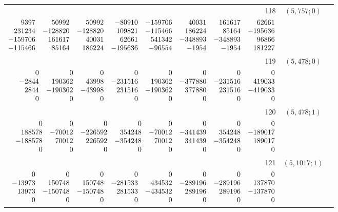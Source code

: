 \documentclass[11pt]{article}
\theoremstyle{remark}
\numberwithin{equation}{section}
\begin{document}
\begin{longtable}{rcl}
118 & $(5,757;0)$ & \begin{tabular}[t]{@{}l@{}}$w_i=\displaystyle \frac{7778090159809309}{114395153011305824000000000000000000}$\\[3pt]{\scriptsize$\begin{array}{@{}rrrrrrrr@{}}9397 & 50992 & 50992 & -80910 & -159706 & 40031 & 161617 & 62661\\231234 & -128820 & -128820 & 109821 & -115466 & 186224 & 85164 & -195636\\-159706 & 161617 & 40031 & 62661 & 541342 & -348893 & -348893 & 96866\\-115466 & 85164 & 186224 & -195636 & -96554 & -1954 & -1954 & 181227\end{array}$}\end{tabular}\\[8pt]
119 & $(5,478;0)$ & \begin{tabular}[t]{@{}l@{}}$w_i=\displaystyle \frac{14506664330807267}{18089855369164800000000000000000000}$\\[3pt]{\scriptsize$\begin{array}{@{}rrrrrrrr@{}}0 & 0 & 0 & 0 & 0 & 0 & 0 & 0\\-2844 & 190362 & 43998 & -231516 & 190362 & -377880 & -231516 & 419033\\2844 & -190362 & -43998 & 231516 & -190362 & 377880 & 231516 & -419033\\0 & 0 & 0 & 0 & 0 & 0 & 0 & 0\end{array}$}\end{tabular}\\[8pt]
120 & $(5,478;1)$ & \begin{tabular}[t]{@{}l@{}}$w_i=\displaystyle \frac{11607564714560783}{8972274846207200000000000000000000}$\\[3pt]{\scriptsize$\begin{array}{@{}rrrrrrrr@{}}0 & 0 & 0 & 0 & 0 & 0 & 0 & 0\\188578 & -70012 & -226592 & 354248 & -70012 & -341439 & 354248 & -189017\\-188578 & 70012 & 226592 & -354248 & 70012 & 341439 & -354248 & 189017\\0 & 0 & 0 & 0 & 0 & 0 & 0 & 0\end{array}$}\end{tabular}\\[8pt]
121 & $(5,1017;1)$ & \begin{tabular}[t]{@{}l@{}}$w_i=\displaystyle \frac{3057017586128491}{3569484717170392800000000000000000}$\\[3pt]{\scriptsize$\begin{array}{@{}rrrrrrrr@{}}0 & 0 & 0 & 0 & 0 & 0 & 0 & 0\\-13973 & 150748 & 150748 & -281533 & 434532 & -289196 & -289196 & 137870\\13973 & -150748 & -150748 & 281533 & -434532 & 289196 & 289196 & -137870\\0 & 0 & 0 & 0 & 0 & 0 & 0 & 0\end{array}$}\end{tabular}\\[8pt]

\end{longtable}
\end{document}
